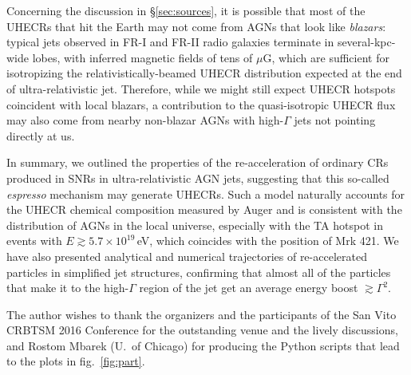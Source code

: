 \documentclass[3p,times,twocolumn]{elsarticle}
\begin{document}
Concerning the discussion in \S\ref{sec:sources}, it is possible that most of the UHECRs that hit the Earth may not come from AGNs that look like  \emph{blazars}: typical jets observed in FR-I and FR-II radio galaxies terminate in several-kpc-wide lobes, with inferred magnetic fields of tens of $\mu$G, which are sufficient for isotropizing the relativistically-beamed UHECR distribution expected at the end of ultra-relativistic jet.
Therefore, while we might still expect UHECR hotspots coincident with local blazars, a contribution to the quasi-isotropic UHECR flux may  also come from nearby non-blazar AGNs with high-$\Gamma$ jets not pointing directly at us. 

In summary, we outlined the properties of the re-acceleration of ordinary CRs produced in SNRs in ultra-relativistic AGN jets, suggesting that this so-called \emph{espresso} mechanism may generate UHECRs.
Such a model naturally accounts for the UHECR chemical composition measured by Auger and is consistent with the distribution of AGNs in the local universe, especially with the TA hotspot in events with $E\gtrsim 5.7\times 10^{19}$\,eV, which coincides with the position of Mrk 421.
We have also presented analytical and numerical trajectories of re-accelerated particles in  simplified jet structures, confirming that almost all of the particles that make it to the high-$\Gamma$ region of the jet get an average energy boost $\gtrsim \Gamma^2$.

\vspace{.5cm}
The author wishes to thank the organizers and the participants of the San Vito CRBTSM 2016 Conference for the outstanding venue and the lively discussions, and Rostom Mbarek (U.\ of Chicago) for producing the Python scripts that lead to the plots in fig.\ \ref{fig:part}.














\end{document}

